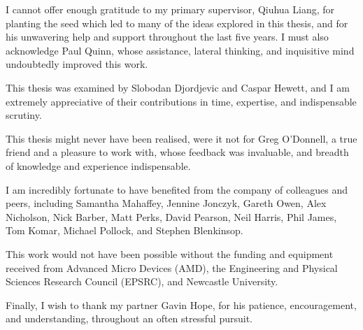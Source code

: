 \begin{acknowledgements}
I cannot offer enough gratitude to my primary supervisor, Qiuhua Liang, for planting the seed which led to many of the ideas explored in this thesis, and for his unwavering help and support throughout the last five years. I must also acknowledge Paul Quinn, whose assistance, lateral thinking, and inquisitive mind undoubtedly improved this work.

This thesis was examined by Slobodan Djordjevic and Caspar Hewett, and I am extremely appreciative of their contributions in time, expertise, and indispensable scrutiny.

This thesis might never have been realised, were it not for Greg O'Donnell, a true friend and a pleasure to work with, whose feedback was invaluable, and breadth of knowledge and experience indispensable.

I am incredibly fortunate to have benefited from the company of colleagues and peers, including Samantha Mahaffey, Jennine Jonczyk, Gareth Owen, Alex Nicholson, Nick Barber, Matt Perks, David Pearson, Neil Harris, Phil James, Tom Komar, Michael Pollock, and Stephen Blenkinsop.

This work would not have been possible without the funding and equipment received from Advanced Micro Devices (AMD), the Engineering and Physical Sciences Research Council (EPSRC), and Newcastle University.

Finally, I wish to thank my partner Gavin Hope, for his patience, encouragement, and understanding, throughout an often stressful pursuit.
\end{acknowledgements}